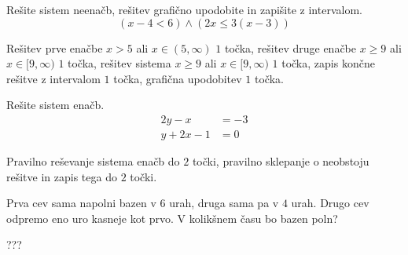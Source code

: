 \documentclass[addpoints]{exam}
\begin{document}
\begin{questions}
        

\newpage
    \question[5]
    Rešite sistem neenačb, rešitev grafično upodobite in zapišite z intervalom.
    $$ \left(x-4<6\right)\land\left(2x\leq 3(x-3)\right) $$
    
    
    \begin{solution}[11cm]
        Rešitev prve enačbe $x>5$ ali $x\in(5,\infty)$ $1$ točka, rešitev druge enačbe $x\geq 9$ ali $x\in[9,\infty)$ $1$ točka, rešitev sistema $x\geq 9$ ali $x\in[9,\infty)$ $1$ točka, zapis končne rešitve z intervalom $1$ točka, grafična upodobitev $1$ točka.
    \end{solution}




    \question[4]
    Rešite sistem enačb.
    $$ \begin{aligned}
       2y-x&=-3  \\ y+2x-1&=0
    \end{aligned} $$
    
    
    \begin{solution}[8cm]
        Pravilno reševanje sistema enačb do $2$ točki, pravilno sklepanje o neobstoju rešitve in zapis tega do $2$ točki.
    \end{solution}

    \newpage

    \question[4]
    Prva cev sama napolni bazen v $6$ urah, druga sama pa v $4$ urah. Drugo cev odpremo eno uro kasneje kot prvo.
    V kolikšnem času bo bazen poln?
    
    
    \begin{solution}[10cm]
        ???
    \end{solution}





    
    
    
    





\end{questions}
\end{document}
